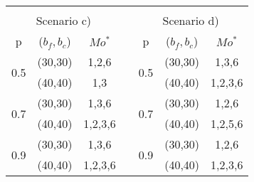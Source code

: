 \begin{table}[htbp]
{\begin{tabular}{ccccccc}
                                           &                                  &                              &                       &                                           &                                  &                              \\
\multicolumn{3}{c}{Scenario c)}                                                                              &                       & \multicolumn{3}{c}{Scenario d)}                                                                             \\ \cline{1-3} \cline{5-7} 
\multicolumn{1}{|c|}{p}                    & \multicolumn{1}{c|}{($b_f,b_c$)} & \multicolumn{1}{c|}{$Mo^*$}  & \multicolumn{1}{c|}{} & \multicolumn{1}{c|}{p}                    & \multicolumn{1}{c|}{($b_f,b_c$)} & \multicolumn{1}{c|}{$Mo^*$}  \\ \cline{1-3} \cline{5-7} 
\multicolumn{1}{|c|}{\multirow{2}{*}{0.5}} & \multicolumn{1}{c|}{(30,30)}     & \multicolumn{1}{c|}{1,2,6}   & \multicolumn{1}{c|}{} & \multicolumn{1}{c|}{\multirow{2}{*}{0.5}} & \multicolumn{1}{c|}{(30,30)}     & \multicolumn{1}{c|}{1,3,6}   \\ \cline{2-3} \cline{6-7} 
\multicolumn{1}{|c|}{}                     & \multicolumn{1}{c|}{(40,40)}     & \multicolumn{1}{c|}{1,3}     & \multicolumn{1}{c|}{} & \multicolumn{1}{c|}{}                     & \multicolumn{1}{c|}{(40,40)}     & \multicolumn{1}{c|}{1,2,3,6} \\ \cline{1-3} \cline{5-7} 
\multicolumn{1}{|c|}{\multirow{2}{*}{0.7}} & \multicolumn{1}{c|}{(30,30)}     & \multicolumn{1}{c|}{1,3,6}   & \multicolumn{1}{c|}{} & \multicolumn{1}{c|}{\multirow{2}{*}{0.7}} & \multicolumn{1}{c|}{(30,30)}     & \multicolumn{1}{c|}{1,2,6}   \\ \cline{2-3} \cline{6-7} 
\multicolumn{1}{|c|}{}                     & \multicolumn{1}{c|}{(40,40)}     & \multicolumn{1}{c|}{1,2,3,6} & \multicolumn{1}{c|}{} & \multicolumn{1}{c|}{}                     & \multicolumn{1}{c|}{(40,40)}     & \multicolumn{1}{c|}{1,2,5,6} \\ \cline{1-3} \cline{5-7} 
\multicolumn{1}{|c|}{\multirow{2}{*}{0.9}} & \multicolumn{1}{c|}{(30,30)}     & \multicolumn{1}{c|}{1,3,6}   & \multicolumn{1}{c|}{} & \multicolumn{1}{c|}{\multirow{2}{*}{0.9}} & \multicolumn{1}{c|}{(30,30)}     & \multicolumn{1}{c|}{1,2,6}   \\ \cline{2-3} \cline{6-7} 
\multicolumn{1}{|c|}{}                     & \multicolumn{1}{c|}{(40,40)}     & \multicolumn{1}{c|}{1,2,3,6} & \multicolumn{1}{c|}{} & \multicolumn{1}{c|}{}                     & \multicolumn{1}{c|}{(40,40)}     & \multicolumn{1}{c|}{1,2,3,6} \\ \cline{1-3} \cline{5-7} 

\end{tabular}}
\end{table}
